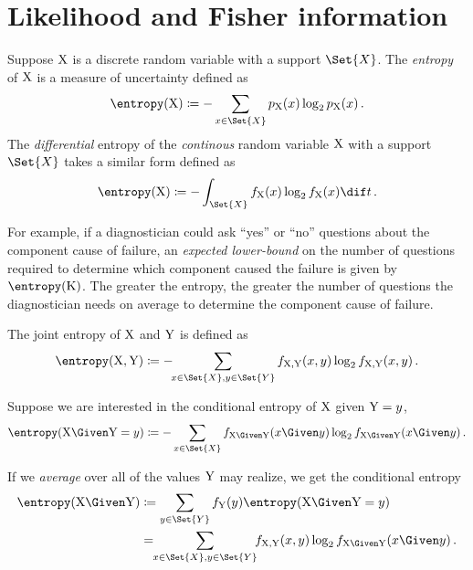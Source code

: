\documentclass[../main.tex]{subfiles}
\begin{document}
\chapter{Likelihood and Fisher information}
\label{sec:general_fisher_info}

\begin{definition}
Suppose $\mathrm{X}$ is a discrete random variable with a support $\Set{X}$.
The \emph{entropy} of $\mathrm{X}$ is a measure of uncertainty defined as
\begin{equation}
	\entropy(\RV{X}) \coloneqq -\sum_{x \in \Set{X}} \pmf_{\RV{X}}(x)
	\log_2 \pmf_{\RV{X}}(x)\,.
\end{equation}
The \emph{differential} entropy of the \emph{continous} random variable $\mathrm{X}$ with a support $\Set{X}$ takes a similar form defined as
\begin{equation}
\entropy(\RV{X}) \coloneqq -\int_{\Set{X}} \pdf_{\RV{X}}(x) \log_2 \pdf_{\RV{X}}(x) \dif t\,.
\end{equation}
\end{definition}

For example, if a diagnostician could ask ``yes'' or ``no'' questions about the component cause of failure, an \emph{expected lower-bound} on the number of questions required to determine which component caused the failure is given by $\entropy(\RV{K})$.
The greater the entropy, the greater the number of questions the diagnostician needs on average to determine the component cause of failure.

The joint entropy of $\mathrm{X}$ and $\mathrm{Y}$ is defined as
\begin{equation}
	\entropy(\RV{X}, \RV{Y}) \coloneqq -\!\! \sum_{x \in \Set{X}, y \in \Set{Y}}
	\pdf_{\RV{X},\RV{Y}}(x,y) \log_2 \pdf_{\RV{X},\RV{Y}}(x,y)\,.
\end{equation}

Suppose we are interested in the conditional entropy of $\mathrm{X}$ given $\mathrm{Y} = y$,
\begin{equation}
\entropy(\RV{X} \Given \RV{Y} = y) \coloneqq - \sum_{x \in \Set{X}}
\pdf_{\RV{X} \Given \RV{Y}}(x \Given y) \log_2 \pdf_{\RV{X} \Given \RV{Y}}(x \Given y)\,.
\end{equation}

If we \emph{average} over all of the values $\mathrm{Y}$ may realize, we get the conditional entropy
\begin{align}
	\entropy(\RV{X} \Given \RV{Y}) &\coloneqq \sum_{y \in \Set{Y}} \pdf_{\RV{Y}}(y) \entropy(\RV{X} \Given \RV{Y} = y)\\
								   &= \!\! \sum_{ x \in \Set{X}, y \in \Set{Y}} \!\! \pdf_{\RV{X},\RV{Y}}(x,y) \log_2 \pdf_{\RV{X} \Given \RV{Y}}(x \Given y)\,.
\end{align}
\end{document}
